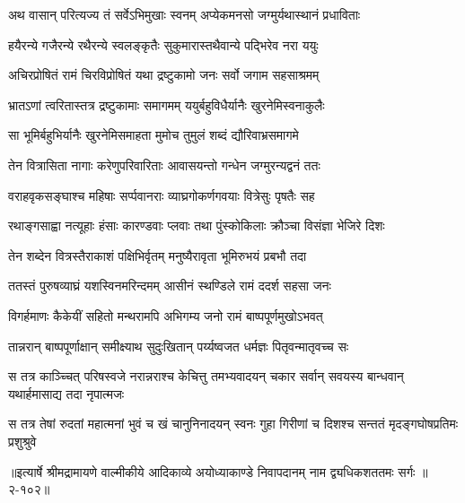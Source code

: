 \twolineshloka
{अथ वासान् परित्यज्य तं सर्वेऽभिमुखाः स्वनम्}
{अप्येकमनसो जग्मुर्यथास्थानं प्रधाविताः} %

\twolineshloka
{हयैरन्ये गजैरन्ये रथैरन्ये स्वलङ्कृतैः}
{सुकुमारास्तथैवान्ये पद्भिरेव नरा ययुः} %

\twolineshloka
{अचिरप्रोषितं रामं चिरविप्रोषितं यथा}
{द्रष्टुकामो जनः सर्वो जगाम सहसाश्रमम्} %

\twolineshloka
{भ्रातऽणां त्वरितास्तत्र द्रष्टुकामाः समागमम्}
{ययुर्बहुविधैर्यानैः खुरनेमिस्वनाकुलैः} %

\twolineshloka
{सा भूमिर्बहुभिर्यानैः खुरनेमिसमाहता}
{मुमोच तुमुलं शब्दं द्यौरिवाभ्रसमागमे} %

\twolineshloka
{तेन वित्रासिता नागाः करेणुपरिवारिताः}
{आवासयन्तो गन्धेन जग्मुरन्यद्वनं ततः} %

\twolineshloka
{वराहवृकसङ्घाश्च महिषाः सर्प्पवानराः}
{व्याघ्रगोकर्णगवयाः वित्रेसुः पृषतैः सह} %

\twolineshloka
{रथाङ्गसाह्वा नत्यूहाः हंसाः कारण्डवाः प्लवाः}
{तथा पुंस्कोकिलाः क्रौञ्चा विसंज्ञा भेजिरे दिशः} %

\twolineshloka
{तेन शब्देन वित्रस्तैराकाशं पक्षिभिर्वृतम्}
{मनुष्यैरावृता भूमिरुभयं प्रबभौ तदा} %

\twolineshloka
{ततस्तं पुरुषव्याघ्रं यशस्विनमरिन्दमम्}
{आसीनं स्थण्डिले रामं ददर्श सहसा जनः} %

\twolineshloka
{विगर्हमाणः कैकेयीं सहितो मन्थरामपि}
{अभिगम्य जनो रामं बाष्पपूर्णमुखोऽभवत्} %

\twolineshloka
{तान्नरान् बाष्पपूर्णाक्षान् समीक्ष्याथ सुदुःखितान्}
{पर्य्यष्वजत धर्मज्ञः पितृवन्मातृवच्च सः} %

\twolineshloka
{स तत्र काञ्च्चित् परिषस्वजे नरान्नराश्च केचित्तु तमभ्यवादयन्}
{चकार सर्वान् सवयस्य बान्धवान् यथार्हमासाद्य तदा नृपात्मजः} %

\twolineshloka
{स तत्र तेषां रुदतां महात्मनां भुवं च खं चानुनिनादयन् स्वनः}
{गुहा गिरीणां च दिशश्च सन्ततं मृदङ्गघोषप्रतिमः प्रशुश्रुवे} %


॥इत्यार्षे श्रीमद्रामायणे वाल्मीकीये आदिकाव्ये अयोध्याकाण्डे निवापदानम् नाम द्व्यधिकशततमः सर्गः ॥२-१०२॥

